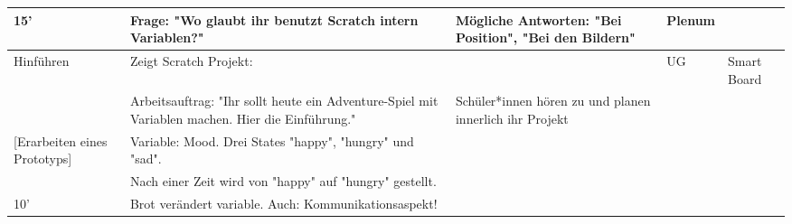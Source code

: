 \documentclass{article}
\begin{document}
\begin{tabularx}{\textwidth}{|X|X|X|X|X|}
15'                              & Frage: "Wo glaubt ihr benutzt Scratch intern Variablen?"                                                                    & Mögliche Antworten: "Bei Position", "Bei den Bildern"                                & Plenum                                                                                   &                                                                             \\ \hline
Hinführen                        & Zeigt Scratch Projekt:                                                                                                      &                                                                                      & UG                                                                                       & Smart Board                                                                 \\
                                 & Arbeitsauftrag: "Ihr sollt heute ein Adventure-Spiel mit Variablen machen.  Hier die Einführung."                           & Schüler*innen hören zu und planen innerlich ihr Projekt                              &                                                                                          &                                                                             \\
{[}Erarbeiten eines Prototyps{]} & Variable: Mood. Drei States "happy", "hungry" und "sad".                                                                    &                                                                                      &                                                                                          &                                                                             \\
                                 & Nach einer Zeit wird von "happy" auf "hungry" gestellt.                                                                     &                                                                                      &                                                                                          &                                                                             \\
10'                              & Brot verändert variable. Auch: Kommunikationsaspekt!                                                                        &                                                                                      &                                                                                          &                                                                             \\ \hline

\end{tabularx}
\end{document}

